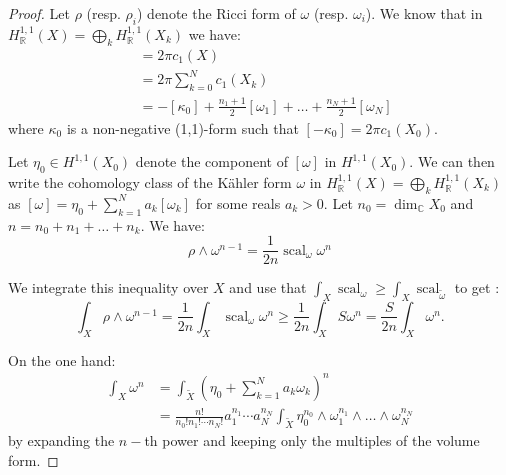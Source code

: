 \documentclass{amsart}
\numberwithin{equation}{section}
\theoremstyle{definition}
\DeclareMathOperator{\scal}{scal}
\begin{document}
\begin{proof}
Let $\rho$ (resp. $\rho_i$) denote the Ricci form of $\omega$ (resp. $\omega_i$). We know that in $H_{\mathbb{R}}^{1,1}(X)=\bigoplus_k H^{1,1}_\mathbb{R}(X_k)$ we have:
\begin{align*}
    [\rho]&=2\pi c_1(X)\\
    &=2\pi \sum_{k=0}^N c_1(X_k)\\
    &=-[\kappa_0]+\frac{n_1+1}{2}[\omega_1]+\dots+\frac{n_N+1}{2}[\omega_N]
\end{align*}
where $\kappa_0$ is a non-negative (1,1)-form such that $[-\kappa_0]=2\pi c_1(X_0)$.

Let $\eta_0\in H^{1,1}(X_0)$ denote the component of $[\omega]$ in $H^{1,1}(X_0)$. We can then write the cohomology class of the K\"ahler form $\omega$ in $H_{\mathbb{R}}^{1,1}(X)=\bigoplus_k H^{1,1}_\mathbb{R}(X_k)$ as  $[\omega]=\eta_0+\sum_{k=1}^Na_k[\omega_k]$ for some reals $a_k>0$. %
Let $n_0=\dim_\mathbb{C}X_0$ and $n=n_0+n_1+\dots+n_k$. We have:
\[\rho\wedge\omega^{n-1}=\frac{1}{2n}\scal_\omega\omega^n%
\]

We integrate this inequality over $X$ and use that $\int_X\scal_\omega\geq\int_X\scal_{\tilde\omega}$
 to get :
\[\int_{X}\rho\wedge\omega^{n-1}=\frac{1}{2n}\int_X\scal_\omega\omega^n\geq\frac{1}{2n}\int_X S\omega^n =\frac{S}{2n}\int_{X}\omega^n.\]

On the one hand:
\begin{align*}
    \int_{X}\omega^{n}&=\int_{\tilde X}\left(\eta_0+\sum_{k=1}^Na_k\omega_k\right)^{n} \\
    &=\frac{n!}{n_0!n_1!\cdots n_N!}a_1^{n_1}\cdots a_N^{n_N}\int_{\tilde X}\eta_0^{n_0}\wedge\omega_1^{n_1}\wedge\dots\wedge\omega_N^{n_N}
\end{align*}
by expanding the $n-$th power and keeping only the multiples of the volume form.


\end{proof}
\end{document}
